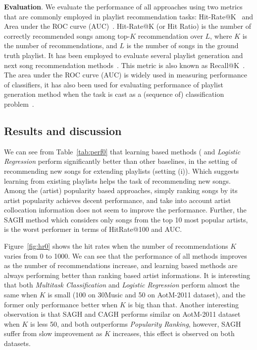 {\bf Evaluation}.
We evaluate the performance of all approaches using two metrics that are commonly employed in playlist recommendation tasks:
Hit-Rate@K~\cite{hariri2012context} and Area under the ROC curve (AUC)~\cite{manning2008introIR}.
%
%
Hit-Rate@K (or Hit Ratio) is the number of correctly recommended songs among top-$K$ recommendation over $L$,
where $K$ is the number of recommendations, and $L$ is the number of songs in the ground truth playlist.
It has been employed to evaluate several playlist generation and next song recommendation
methods~\cite{hariri2012context,bonnin2013evaluating,bonnin2015automated,jannach2015beyond}.
This metric is also known as Recall@K~\cite{schedl2017}.
%
The area under the ROC curve (AUC) is widely used in measuring performance of classifiers,
it has also been used for evaluating performance of playlist generation method when the task
is cast as a (sequence of) classification problem~\cite{ben2017groove}.


\subsection{Results and discussion}

We can see from Table~\ref{tab:perf0} that learning based methods (
and {\it Logistic Regression} perform significantly better than other baselines, in the setting of
recommending new songs for extending playlists (setting (i)).
Which suggests learning from existing playlists helps the task of recommending new songs.
Among the (artist) popularity based approaches, 
simply ranking songs by its artist popularity achieves decent performance,
and take into account artist collocation information does not seem to improve the performance.
Further, the SAGH method which considers only songs from the top 10 most popular artists,
is the worst performer in terms of HitRate@100 and AUC.

Figure~\ref{fig:hr0} shows the hit rates when the number of recommendations $K$ varies from 0 to 1000.
We can see that the performance of all methods improves as the number of recommendations increase,
and learning based methods are always performing better than ranking based artist informations.
It is interesting that both {\it Multitask Classification} and {\it Logistic Regression} perform 
almost the same when $K$ is small (100 on 30Music and 50 on AotM-2011 dataset), 
and the former only performance better when $K$ is big than that.
Another interesting observation is that SAGH and CAGH performs similar on AotM-2011 dataset when $K$
is less 50, and both outperforms {\it Popularity Ranking}, however, SAGH suffer from slow improvement
as $K$ increases, this effect is observed on both datasets.


